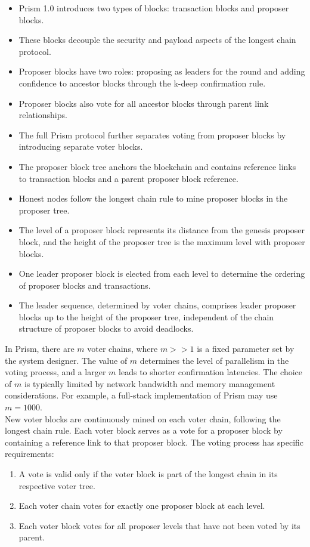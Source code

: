 \begin{itemize}
    \item Prism 1.0 introduces two types of blocks: transaction blocks and proposer blocks.
    \item These blocks decouple the security and payload aspects of the longest chain protocol.
    \item Proposer blocks have two roles: proposing as leaders for the round and adding confidence to ancestor blocks through the k-deep confirmation rule.
    \item Proposer blocks also vote for all ancestor blocks through parent link relationships.
    \item The full Prism protocol further separates voting from proposer blocks by introducing separate voter blocks.
    \item The proposer block tree anchors the blockchain and contains reference links to transaction blocks and a parent proposer block reference.
    \item Honest nodes follow the longest chain rule to mine proposer blocks in the proposer tree.
    \item The level of a proposer block represents its distance from the genesis proposer block, and the height of the proposer tree is the maximum level with proposer blocks.
    \item One leader proposer block is elected from each level to determine the ordering of proposer blocks and transactions.
    \item The leader sequence, determined by voter chains, comprises leader proposer blocks up to the height of the proposer tree, independent of the chain structure of proposer blocks to avoid deadlocks.
\end{itemize}
In Prism, there are $m$ voter chains, where $m >> 1$ is a fixed parameter set by the system designer. The value of $m$ determines the level of parallelism in the voting process, and a larger $m$ leads to shorter confirmation latencies. The choice of $m$ is typically limited by network bandwidth and memory management considerations. For example, a full-stack implementation of Prism may use $m = 1000$.\\
New voter blocks are continuously mined on each voter chain, following the longest chain rule. Each voter block serves as a vote for a proposer block by containing a reference link to that proposer block. The voting process has specific requirements: 
\begin{enumerate}
    \item A vote is valid only if the voter block is part of the longest chain in its respective voter tree.
    \item Each voter chain votes for exactly one proposer block at each level.
    \item Each voter block votes for all proposer levels that have not been voted by its parent.
\end{enumerate}
